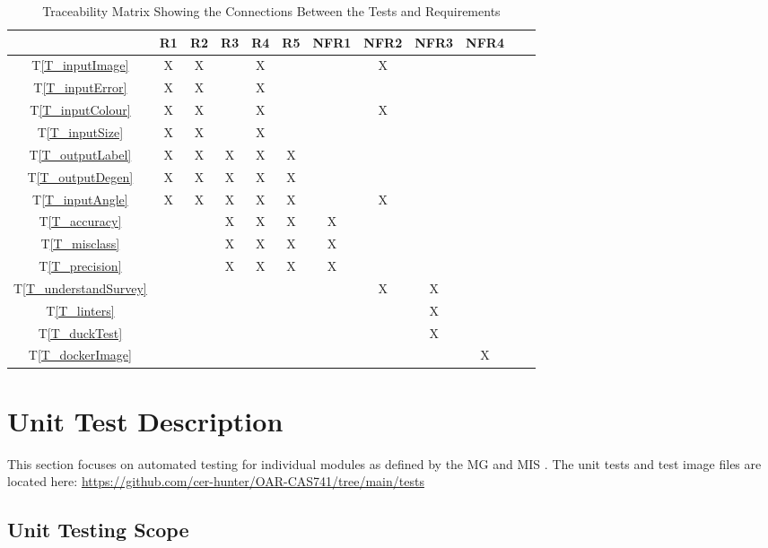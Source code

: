 \documentclass[12pt, titlepage]{article}
\newcommand{\tref}[1]{T\ref{#1}}
\begin{document}
\begin{table}[h!]
  \centering
  \begin{tabular}{|c|c|c|c|c|c|c|c|c|c|c|c|}
  \hline
    & R1
    & R2
    & R3
    & R4
    & R5
    & NFR1
    & NFR2
    & NFR3
    & NFR4
  \\ \hline
  \tref{T_inputImage}           &X&X& &X& & &X& & \\ \hline
  \tref{T_inputError}           &X&X& &X& & & & & \\ \hline
  \tref{T_inputColour}          &X&X& &X& & &X& & \\ \hline
  \tref{T_inputSize}            &X&X& &X& & & & & \\ \hline
  \tref{T_outputLabel}          &X&X&X&X&X& & & & \\ \hline
  \tref{T_outputDegen}          &X&X&X&X&X& & & & \\ \hline
  \tref{T_inputAngle}           &X&X&X&X&X& &X& & \\ \hline
  \tref{T_accuracy}             & & &X&X&X&X& & & \\ \hline
  \tref{T_misclass}             & & &X&X&X&X& & & \\ \hline
  \tref{T_precision}            & & &X&X&X&X& & & \\ \hline
  \tref{T_understandSurvey}     & & & & & & &X&X& \\ \hline
  \tref{T_linters}              & & & & & & & &X& \\ \hline
  \tref{T_duckTest}             & & & & & & & &X& \\ \hline
  \tref{T_dockerImage}          & & & & & & & & &X\\ \hline
  \end{tabular}
  \caption{Traceability Matrix Showing the Connections Between the Tests and Requirements}
  \label{Table:A_trace}
\end{table}

\newpage


\section{Unit Test Description}

This section focuses on automated testing for individual modules as defined by the
MG \cite{MG} and MIS \cite{MIS}.
The unit tests and test image files are located here:
\url{https://github.com/cer-hunter/OAR-CAS741/tree/main/tests}

\subsection{Unit Testing Scope}
\end{document}
